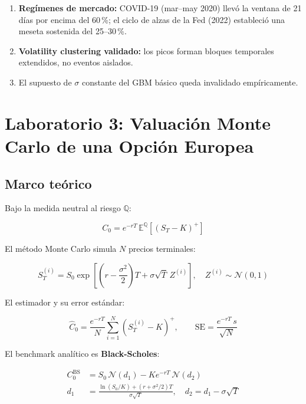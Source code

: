 \documentclass[12pt,letterpaper]{article}
\begin{document}
\begin{enumerate}
  \item \textbf{Reg\'imenes de mercado:} COVID-19 (mar--may 2020) llev\'o la ventana
    de 21 d\'ias por encima del 60\,\%; el ciclo de alzas de la Fed (2022) estableci\'o
    una meseta sostenida del 25--30\,\%.
  \item \textbf{Volatility clustering validado:} los picos forman bloques
    temporales extendidos, no eventos aislados.
  \item El supuesto de $\sigma$ constante del GBM b\'asico queda invalidado
    emp\'iricamente.
\end{enumerate}

\section{Laboratorio 3: Valuaci\'on Monte Carlo de una Opci\'on Europea}

\subsection{Marco te\'orico}

Bajo la medida neutral al riesgo $\mathbb{Q}$:

\begin{equation}
  C_0 = e^{-rT}\,\mathbb{E}^\mathbb{Q}[(S_T - K)^+]
\end{equation}

El m\'etodo Monte Carlo simula $N$ precios terminales:

\begin{equation}
  S_T^{(i)} = S_0 \exp\!\left[\left(r - \frac{\sigma^2}{2}\right)T
    + \sigma\sqrt{T}\,Z^{(i)}\right], \quad Z^{(i)} \sim \mathcal{N}(0,1)
\end{equation}

El estimador y su error est\'andar:

\begin{equation}
  \hat{C}_0 = \frac{e^{-rT}}{N}\sum_{i=1}^N (S_T^{(i)} - K)^+,
  \qquad
  \mathrm{SE} = \frac{e^{-rT}\,s}{\sqrt{N}}
\end{equation}

El benchmark anal\'itico es \textbf{Black-Scholes}:

\begin{align}
  C_0^{\mathrm{BS}} &= S_0\,\mathcal{N}(d_1) - Ke^{-rT}\,\mathcal{N}(d_2) \\
  d_1 &= \frac{\ln(S_0/K) + (r + \sigma^2/2)T}{\sigma\sqrt{T}}, \quad
  d_2 = d_1 - \sigma\sqrt{T}
\end{align}
\end{document}
